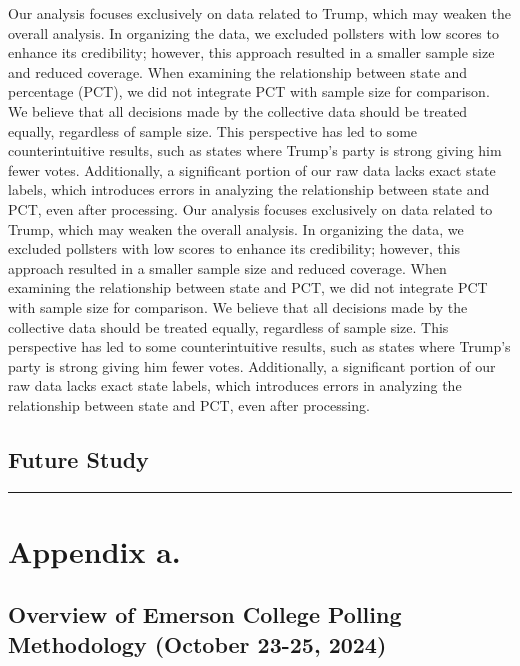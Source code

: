 \documentclass[
  letterpaper,
  DIV=11,
  numbers=noendperiod]{scrartcl}
\begin{document}
Our analysis focuses exclusively on data related to Trump, which may
weaken the overall analysis. In organizing the data, we excluded
pollsters with low scores to enhance its credibility; however, this
approach resulted in a smaller sample size and reduced coverage. When
examining the relationship between state and percentage (PCT), we did
not integrate PCT with sample size for comparison. We believe that all
decisions made by the collective data should be treated equally,
regardless of sample size. This perspective has led to some
counterintuitive results, such as states where Trump's party is strong
giving him fewer votes. Additionally, a significant portion of our raw
data lacks exact state labels, which introduces errors in analyzing the
relationship between state and PCT, even after processing. Our analysis
focuses exclusively on data related to Trump, which may weaken the
overall analysis. In organizing the data, we excluded pollsters with low
scores to enhance its credibility; however, this approach resulted in a
smaller sample size and reduced coverage. When examining the
relationship between state and PCT, we did not integrate PCT with sample
size for comparison. We believe that all decisions made by the
collective data should be treated equally, regardless of sample size.
This perspective has led to some counterintuitive results, such as
states where Trump's party is strong giving him fewer votes.
Additionally, a significant portion of our raw data lacks exact state
labels, which introduces errors in analyzing the relationship between
state and PCT, even after processing.

\hypertarget{future-study}{%
\subsection{Future Study}\label{future-study}}

\begin{center}\rule{0.5\linewidth}{0.5pt}\end{center}

\newpage

\hypertarget{appendix-a.}{%
\section*{Appendix a.}\label{appendix-a.}}

\hypertarget{overview-of-emerson-college-polling-methodology-october-23-25-2024}{%
\subsection{Overview of Emerson College Polling Methodology (October
23-25,
2024)}\label{overview-of-emerson-college-polling-methodology-october-23-25-2024}}
\end{document}
